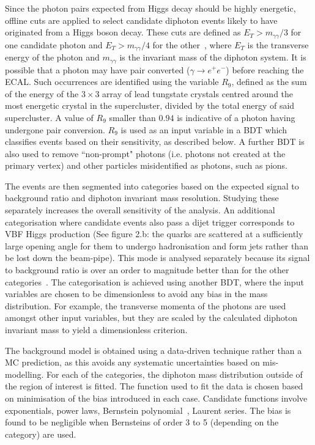 \documentclass[10pt]{article}
\begin{document}
Since the photon pairs expected from Higgs decay should be highly energetic, offline cuts are applied to select candidate diphoton events likely to have originated from a Higgs boson decay. These cuts are defined as $E_T > m_{\gamma \gamma}/3$ for one candidate photon and $E_T > m_{\gamma \gamma}/4$ for the other~\cite{HSearch}, where $E_T$ is the transverse energy of the photon and $m_{\gamma\gamma}$ is the invariant mass of the diphoton system. It is possible that a photon may have pair converted ($\gamma \rightarrow e^+ e^-$) before reaching the ECAL. Such occurrences are identified using the variable $R_9$, defined as the sum of the energy of the $3 \times 3$ array of lead tungstate crystals centred around the most energetic crystal in the supercluster, divided by the total energy of said supercluster. A value of $R_9$ smaller than $0.94$ is indicative of a photon having undergone pair conversion. $R_9$ is used as an input variable in a BDT which classifies events based on their sensitivity, as described below. A further BDT is also used to remove “non-prompt" photons (i.e. photons not created at the primary vertex) and other particles misidentified as photons, such as pions.

The events are then segmented into categories based on the expected signal to background ratio and diphoton invariant mass resolution. Studying these separately increases the overall sensitivity of the analysis. An additional categorisation where candidate events also pass a dijet trigger corresponds to VBF Higgs production (See figure 2.b: the quarks are scattered at a sufficiently large opening angle for them to undergo hadronisation and form jets rather than be lost down the beam-pipe). This mode is analysed separately because its signal to background ratio is over an order to magnitude better than for the other categories~\cite{HSearch}. The categorisation is achieved using another BDT, where the input variables are chosen to be dimensionless to avoid any bias in the mass distribution. For example, the transverse momenta of the photons are used amongst other input variables, but they are scaled by the calculated diphoton invariant mass to yield a dimensionless criterion.

The background model is obtained using a data-driven technique rather than a MC prediction, as this avoids any systematic uncertainties based on mis-modelling. For each of the categories, the diphoton mass distribution outside of the region of interest is fitted. The function used to fit the data is chosen based on minimisation of the bias introduced in each case. Candidate functions involve exponentials, power laws, Bernstein polynomial~\cite{bernstein}, Laurent series. The bias is found to be negligible when Bernsteins of order 3 to 5 (depending on the category) are used.
\end{document}
